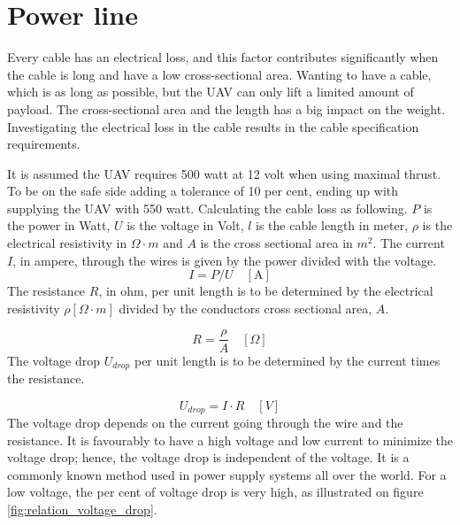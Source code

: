 \section{Power line}
\noindent
Every cable has an electrical loss, and this factor contributes significantly when the cable is long and have a low cross-sectional area. Wanting to have a cable, which is as long as possible, but the UAV can only lift a limited amount of payload. The cross-sectional area and the length has a big impact on the weight. Investigating the electrical loss in the cable results in the cable specification requirements.
 
\noindent
It is assumed the UAV requires 500 watt at 12 volt when using maximal thrust\cite{Wahlgreen2014}. To be on the safe side adding a tolerance of 10 per cent, ending up with supplying the UAV with 550 watt. 
Calculating the cable loss as following. 
$P$ is the power in Watt, $U$ is the voltage in Volt, $l$ is the cable length in meter, $\rho$ is the electrical resistivity in $\Omega \cdot m$ and $A$ is the cross sectional area in $m^2$.
\noindent
The current $I$, in ampere, through the wires is given by the power divided with the voltage.
\begin{equation}
I = P/U \quad [\mathrm{A}]
\end{equation}
\noindent
The resistance $R$, in ohm, per unit length is to be determined by the electrical resistivity $\rho [\Omega \cdot m]$ divided by the conductors cross sectional area, $A$.

\begin{equation}
R = \frac{\rho}{A}\quad [\Omega]
\end{equation}
\noindent
The voltage drop $U_{drop}$ per unit length is to be determined by the current times the resistance.

\begin{equation}
U_{drop} = I \cdot R \quad [V]
\end{equation}
\noindent
The voltage drop depends on the current going through the wire and the resistance. It is favourably to have a high voltage and low current to minimize the voltage drop; hence, the voltage drop is independent of the voltage. It is a commonly known method used in power supply systems all over the world. For a low voltage, the per cent of voltage drop is very high, as illustrated on figure \ref{fig:relation_voltage_drop}.


